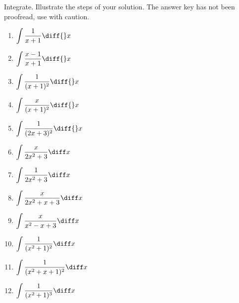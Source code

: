 Integrate. Illustrate the steps of your solution. The answer key has not been proofread, use with caution.
\begin{multicols}{2}
\begin{enumerate}
\item $\displaystyle \int \frac{1}{x+1}\diff {}x$
\item $\displaystyle \int \frac{x-1}{x+1}\diff {}x$


\item $\displaystyle \int \frac{ 1}{(x+1)^2}\diff {}x$


\item $\displaystyle \int \frac{x}{(x+1)^2}\diff {}x$


\item $\displaystyle \int \frac{ 1}{ (2x+3)^2}\diff {}x$

\item $\displaystyle
\int \frac{x}{ 2x^2+3}\diff x
$

\item $\displaystyle
\int \frac{1}{ 2x^2+3}\diff x
$


\item $\displaystyle
\int \frac{x}{ 2x^2+x+3}\diff x
$

\item $\displaystyle
\int \frac{x}{ x^2-x+3}\diff x
$

\item $\displaystyle
\int \frac{1}{ (x^2+1)^2}\diff x
$

\item $\displaystyle
\int \frac{1}{ (x^2+x +1 )^2 } \diff x
$
\item $\displaystyle \int \frac{1}{ (x^2+1)^3}\diff x
$

\end{enumerate}
\end{multicols}
